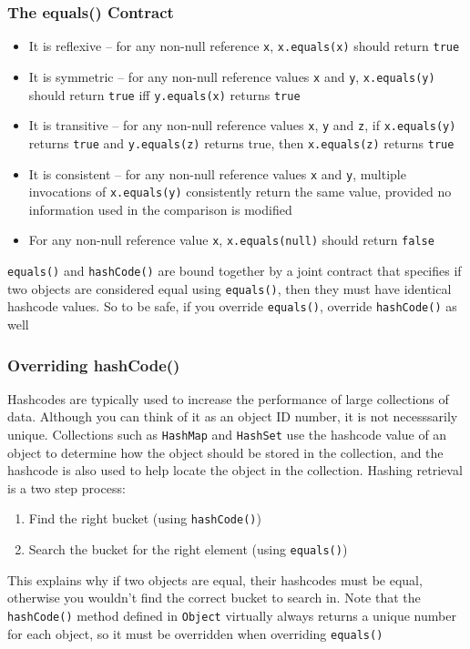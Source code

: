 \subsubsection{The equals() Contract}
\begin{itemize}
    \item It is reflexive -- for any non-null reference \verb#x#, \verb#x.equals(x)# 
    should return \verb#true#
    \item It is symmetric -- for any non-null reference values \verb#x# and \verb#y#, 
    \verb#x.equals(y)# should return \verb#true# iff \verb#y.equals(x)# returns 
    \verb#true#
    \item It is transitive -- for any non-null reference values \verb#x#, \verb#y# and 
    \verb#z#, if \verb#x.equals(y)# returns \verb#true# and \verb#y.equals(z)# 
    returns true, then \verb#x.equals(z)# returns \verb#true#
    \item It is consistent -- for any non-null reference values \verb#x# and \verb#y#, 
    multiple invocations of \verb#x.equals(y)# consistently return the same 
    value, provided no information used in the comparison is modified
    \item For any non-null reference value \verb#x#, \verb#x.equals(null)# 
    should return \verb#false#
\end{itemize}
\verb#equals()# and \verb#hashCode()# are bound together by a joint contract 
that specifies if two objects are considered equal using \verb#equals()#, then 
they must have identical hashcode values. So to be safe, if you override 
\verb#equals()#, override \verb#hashCode()# as well

\subsubsection{Overriding hashCode()}
Hashcodes are typically used to increase the performance of large collections 
of data. Although you can think of it as an object ID number, it is not
necesssarily unique. Collections such as \verb#HashMap# and \verb#HashSet# use 
the hashcode value of an object to determine how the object should be stored in 
the collection, and the hashcode is also used to help locate the object in the 
collection. Hashing retrieval is a two step process:
\begin{enumerate}
    \item Find the right bucket (using \verb#hashCode()#)
    \item Search the bucket for the right element (using \verb#equals()#)
\end{enumerate}
This explains why if two objects are equal, their hashcodes must be equal, 
otherwise you wouldn't find the correct bucket to search in. Note that the 
\verb#hashCode()# method defined in \verb#Object# virtually always returns a 
unique number for each object, so it must be overridden when overriding 
\verb#equals()#

